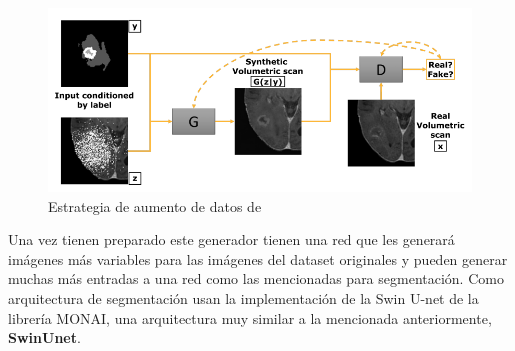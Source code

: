 	\begin{figure}[H]
		\centering
		\includegraphics[width=1.0\linewidth]{imagenes/esquema_faking.png}
		\caption{Estrategia de aumento de datos de \cite{ferreira2024we}}
	\end{figure}
	
	
	Una vez tienen preparado este generador tienen una red que les generará imágenes más variables para las imágenes del dataset originales y pueden generar muchas más entradas a una red como las mencionadas para segmentación. Como arquitectura de segmentación usan la implementación de la Swin U-net de la librería MONAI, una arquitectura muy similar a la mencionada anteriormente, \textbf{SwinUnet}.
	